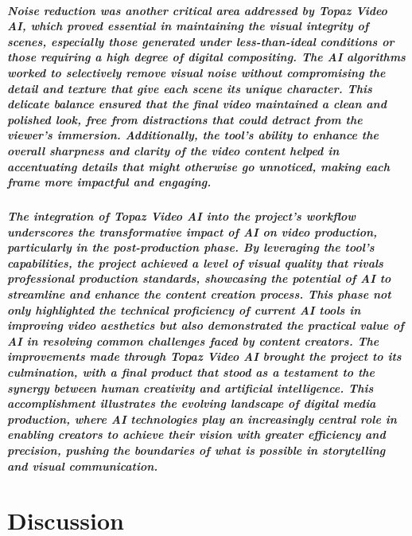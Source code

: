 \documentclass[11pt,a4paper,oneside]{report}
\begin{document}
\paragraph{Noise reduction was another critical area addressed by Topaz Video AI, which proved essential in maintaining the visual integrity of scenes, especially those generated under less-than-ideal conditions or those requiring a high degree of digital compositing. The AI algorithms worked to selectively remove visual noise without compromising the detail and texture that give each scene its unique character. This delicate balance ensured that the final video maintained a clean and polished look, free from distractions that could detract from the viewer's immersion. Additionally, the tool's ability to enhance the overall sharpness and clarity of the video content helped in accentuating details that might otherwise go unnoticed, making each frame more impactful and engaging.}

\paragraph{The integration of Topaz Video AI into the project's workflow underscores the transformative impact of AI on video production, particularly in the post-production phase. By leveraging the tool's capabilities, the project achieved a level of visual quality that rivals professional production standards, showcasing the potential of AI to streamline and enhance the content creation process. This phase not only highlighted the technical proficiency of current AI tools in improving video aesthetics but also demonstrated the practical value of AI in resolving common challenges faced by content creators. The improvements made through Topaz Video AI brought the project to its culmination, with a final product that stood as a testament to the synergy between human creativity and artificial intelligence. This accomplishment illustrates the evolving landscape of digital media production, where AI technologies play an increasingly central role in enabling creators to achieve their vision with greater efficiency and precision, pushing the boundaries of what is possible in storytelling and visual communication.}


\chapter{Discussion}
\label{discussion}
\end{document}
